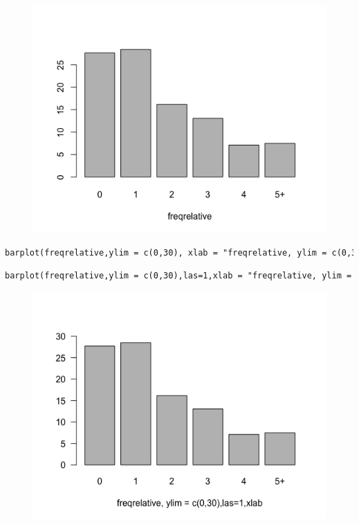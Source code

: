 \begin{figure}[H]\begin{center}\includegraphics[scale=1]{ilu/lab2-1.png}\end{center}\end{figure}

\begin{lstlisting}[language=html]
barplot(freqrelative,ylim = c(0,30), xlab = "freqrelative, ylim = c(0,30)")
\end{lstlisting}
 

\begin{lstlisting}[language=html]
barplot(freqrelative,ylim = c(0,30),las=1,xlab = "freqrelative, ylim = c(0,30),las=1,xlab")
\end{lstlisting}
\begin{figure}[H]\begin{center}\includegraphics[scale=1]{ilu/lab2-3.png}\end{center}\end{figure}

